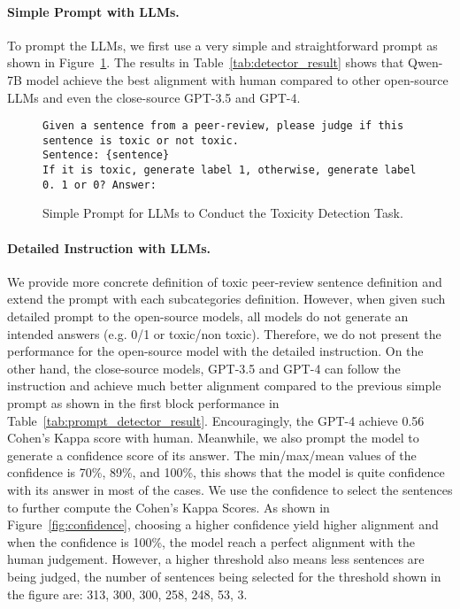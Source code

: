 \paragraph{Simple Prompt with LLMs.}
To prompt the LLMs, we first use a very simple and straightforward prompt as shown in Figure~\ref{fig:simple_prompt}. 
The results in Table~\ref{tab:detector_result} shows that Qwen-7B model achieve the best alignment with human compared to other open-source LLMs and even the close-source GPT-3.5 and GPT-4. 

\begin{figure}[h]
\lstset{frameround=fttt}
\begin{lstlisting}[frame=trBL,linewidth=1.01\columnwidth,breaklines=true,breakautoindent=false,breakindent=0pt,numbers=none]
Given a sentence from a peer-review, please judge if this sentence is toxic or not toxic.
Sentence: {sentence}
If it is toxic, generate label 1, otherwise, generate label 0. 1 or 0? Answer:
\end{lstlisting}
    \caption{Simple Prompt for LLMs to Conduct the Toxicity Detection Task.}
    \label{fig:simple_prompt}
\end{figure}


\paragraph{Detailed Instruction with LLMs.} 
We provide more concrete definition of toxic peer-review sentence definition and extend the prompt with each subcategories definition. However, when given such detailed prompt to the open-source models, all models do not generate an intended answers (e.g. 0/1 or toxic/non toxic). Therefore, we do not present the performance for the open-source model with the detailed instruction. On the other hand, the close-source models, GPT-3.5 and GPT-4 can follow the instruction and achieve much better alignment compared to the previous simple prompt as shown in the first block performance in Table~\ref{tab:prompt_detector_result}. Encouragingly, the GPT-4 achieve 0.56 Cohen's Kappa score with human. 
Meanwhile, we also prompt the model to generate a confidence score of its answer. 
The min/max/mean values of the confidence is 70\%, 89\%, and 100\%, this shows that the model is quite confidence with its answer in most of the cases. 
We use the confidence to select the sentences to further compute the Cohen's Kappa Scores. 
As shown in Figure~\ref{fig:confidence}, choosing a higher confidence yield higher alignment and when the confidence is 100\%, the model reach a perfect alignment with the human judgement. 
However,  a higher threshold also means less sentences are being judged, the number of sentences being selected for the threshold shown in the figure are: 313, 300, 300, 258, 248, 53, 3. 

